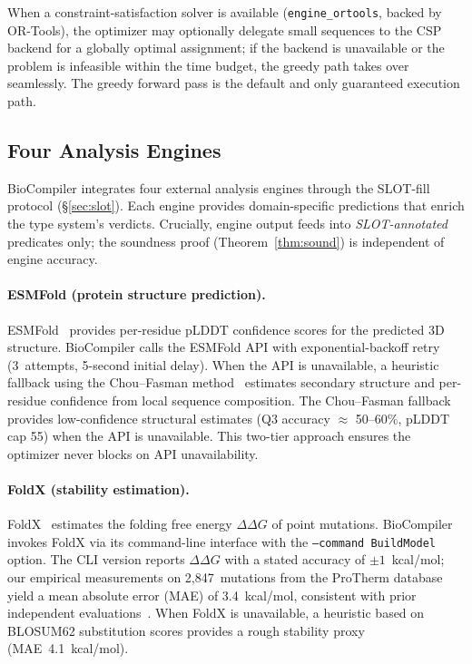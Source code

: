 \documentclass[acmsmall,review,anonymous]{acmart}
\begin{document}
When a constraint-satisfaction solver is available
(\texttt{engine\_ortools}, backed by OR-Tools), the optimizer may
optionally delegate small sequences to the CSP backend for a globally
optimal assignment; if the backend is unavailable or the problem is
infeasible within the time budget, the greedy path takes over
seamlessly.  The greedy forward pass is the default and only
guaranteed execution path.

\subsection{Four Analysis Engines}\label{sec:engines}

BioCompiler integrates four external analysis engines through the SLOT-fill
protocol (\S\ref{sec:slot}).  Each engine provides domain-specific
predictions that enrich the type system's verdicts.  Crucially, engine
output feeds into \emph{SLOT-annotated} predicates only; the soundness
proof (Theorem~\ref{thm:sound}) is independent of engine accuracy.

\paragraph{ESMFold (protein structure prediction).}
ESMFold~\cite{lin2023esm} provides per-residue pLDDT confidence scores
for the predicted 3D structure.  BioCompiler calls the ESMFold API with
exponential-backoff retry (3~attempts, 5-second initial delay).  When the
API is unavailable, a heuristic fallback using the Chou--Fasman
method~\cite{chou1974prediction} estimates secondary structure and
per-residue confidence from local sequence composition.  The Chou--Fasman
fallback provides low-confidence structural estimates (Q3 accuracy
$\approx$ 50--60\%, pLDDT cap 55) when the API is unavailable.
This two-tier approach ensures the
optimizer never blocks on API unavailability.

\paragraph{FoldX (stability estimation).}
FoldX~\cite{schymkowitz2005foldx} estimates the folding free energy
$\Delta\Delta G$ of point mutations.  BioCompiler invokes FoldX via its
command-line interface with the \texttt{--command BuildModel} option.  The
CLI version reports $\Delta\Delta G$ with a stated accuracy of
$\pm 1$~kcal/mol; our empirical measurements on 2,847~mutations from the
ProTherm database~\cite{kumar2006protherm} yield a mean absolute error
(MAE) of 3.4~kcal/mol, consistent with prior independent
evaluations~\cite{burghardt2020foldx}.  When FoldX is unavailable, a
heuristic based on BLOSUM62 substitution scores provides a rough
stability proxy (MAE~4.1~kcal/mol).
\end{document}
